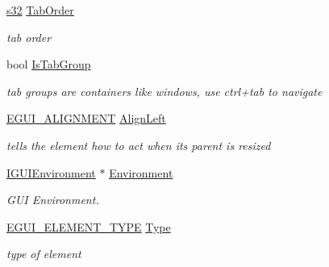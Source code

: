 \begin{DoxyCompactItemize}
\mbox{\label{classirr_1_1gui_1_1IGUIElement_a90fcd9d502bb0f6e8e5f2d091f54bafb}} 
\hyperlink{namespaceirr_ac66849b7a6ed16e30ebede579f9b47c6}{s32} \hyperlink{classirr_1_1gui_1_1IGUIElement_a90fcd9d502bb0f6e8e5f2d091f54bafb}{Tab\+Order}
\begin{DoxyCompactList}\small\item\em tab order \end{DoxyCompactList}\item 
\mbox{\label{classirr_1_1gui_1_1IGUIElement_a8ea1b4a60653c8cc157e806e14ae0558}} 
bool \hyperlink{classirr_1_1gui_1_1IGUIElement_a8ea1b4a60653c8cc157e806e14ae0558}{Is\+Tab\+Group}
\begin{DoxyCompactList}\small\item\em tab groups are containers like windows, use ctrl+tab to navigate \end{DoxyCompactList}\item 
\mbox{\label{classirr_1_1gui_1_1IGUIElement_a09873f314caf3144ebf470ccaa22762a}} 
\hyperlink{namespaceirr_1_1gui_a19eb5fb40e67f108cb16aba922ddaa2d}{E\+G\+U\+I\+\_\+\+A\+L\+I\+G\+N\+M\+E\+NT} \hyperlink{classirr_1_1gui_1_1IGUIElement_a09873f314caf3144ebf470ccaa22762a}{Align\+Left}
\begin{DoxyCompactList}\small\item\em tells the element how to act when its parent is resized \end{DoxyCompactList}\item 
\mbox{\label{classirr_1_1gui_1_1IGUIElement_a7ce2d55a64302d3df67a808a362f18bf}} 
\hyperlink{classirr_1_1gui_1_1IGUIEnvironment}{I\+G\+U\+I\+Environment} $\ast$ \hyperlink{classirr_1_1gui_1_1IGUIElement_a7ce2d55a64302d3df67a808a362f18bf}{Environment}
\begin{DoxyCompactList}\small\item\em G\+UI Environment. \end{DoxyCompactList}\item 
\mbox{\label{classirr_1_1gui_1_1IGUIElement_ad362880afa8ccb537b04032340e989e9}} 
\hyperlink{namespaceirr_1_1gui_ae4d66df0ecf4117cdbcf9f22404bd254}{E\+G\+U\+I\+\_\+\+E\+L\+E\+M\+E\+N\+T\+\_\+\+T\+Y\+PE} \hyperlink{classirr_1_1gui_1_1IGUIElement_ad362880afa8ccb537b04032340e989e9}{Type}
\begin{DoxyCompactList}\small\item\em type of element \end{DoxyCompactList}\end{DoxyCompactItemize}
